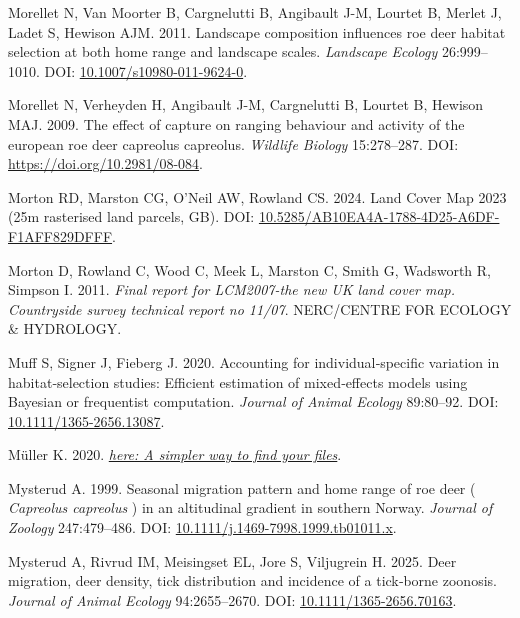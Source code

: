 \documentclass[10pt,a4paper]{article}
\newlength{\cslhangindent}
\newenvironment{CSLReferences}[2] %
 {\begin{list}{}{%
  \setlength{\itemindent}{0pt}
  \setlength{\leftmargin}{0pt}
  \setlength{\parsep}{0pt}
  \ifodd #1
   \setlength{\leftmargin}{\cslhangindent}
   \setlength{\itemindent}{-1\cslhangindent}
  \fi
  \setlength{\itemsep}{#2\baselineskip}}}
 {\end{list}}
\begin{document}
\begin{CSLReferences}{1}{0}
Morellet N, Van Moorter B, Cargnelutti B, Angibault J-M, Lourtet B, Merlet J, Ladet S, Hewison AJM. 2011. Landscape composition influences roe deer habitat selection at both home range and landscape scales. \emph{Landscape Ecology} 26:999--1010. DOI: \href{https://doi.org/10.1007/s10980-011-9624-0}{10.1007/s10980-011-9624-0}.

Morellet N, Verheyden H, Angibault J-M, Cargnelutti B, Lourtet B, Hewison MAJ. 2009. The effect of capture on ranging behaviour and activity of the european roe deer capreolus capreolus. \emph{Wildlife Biology} 15:278--287. DOI: \url{https://doi.org/10.2981/08-084}.

Morton RD, Marston CG, O'Neil AW, Rowland CS. 2024. Land {Cover} {Map} 2023 (25m rasterised land parcels, {GB}). DOI: \href{https://doi.org/10.5285/AB10EA4A-1788-4D25-A6DF-F1AFF829DFFF}{10.5285/AB10EA4A-1788-4D25-A6DF-F1AFF829DFFF}.

Morton D, Rowland C, Wood C, Meek L, Marston C, Smith G, Wadsworth R, Simpson I. 2011. \emph{Final report for {LCM2007}-the new {UK} land cover map. {Countryside} survey technical report no 11/07}. NERC/CENTRE FOR ECOLOGY \& HYDROLOGY.

Muff S, Signer J, Fieberg J. 2020. Accounting for individual‐specific variation in habitat‐selection studies: {Efficient} estimation of mixed‐effects models using {Bayesian} or frequentist computation. \emph{Journal of Animal Ecology} 89:80--92. DOI: \href{https://doi.org/10.1111/1365-2656.13087}{10.1111/1365-2656.13087}.

Müller K. 2020. \emph{\href{https://CRAN.R-project.org/package=here}{{here}: A simpler way to find your files}}.

Mysterud A. 1999. Seasonal migration pattern and home range of roe deer ( \emph{{Capreolus} capreolus} ) in an altitudinal gradient in southern {Norway}. \emph{Journal of Zoology} 247:479--486. DOI: \href{https://doi.org/10.1111/j.1469-7998.1999.tb01011.x}{10.1111/j.1469-7998.1999.tb01011.x}.

Mysterud A, Rivrud IM, Meisingset EL, Jore S, Viljugrein H. 2025. Deer migration, deer density, tick distribution and incidence of a tick‐borne zoonosis. \emph{Journal of Animal Ecology} 94:2655--2670. DOI: \href{https://doi.org/10.1111/1365-2656.70163}{10.1111/1365-2656.70163}.


\end{CSLReferences}
\end{document}
